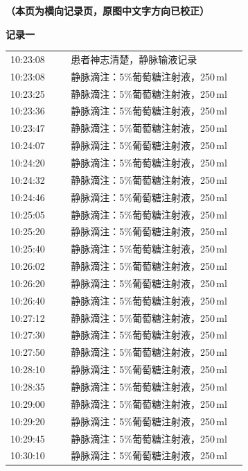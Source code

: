 \documentclass[UTF8,10pt,a4paper,fontset=fandol]{ctexart}
\begin{document}
\newpage

\begin{center}
\textbf{（本页为横向记录页，原图中文字方向已校正）}
\end{center}

\noindent
\begin{minipage}[t]{0.47\linewidth}
\small
\textbf{记录一}\\[2pt]
\begin{tabular}{@{}p{0.24\linewidth}p{0.70\linewidth}@{}}
10:23:08 & 患者神志清楚，静脉输液记录\\
10:23:08 & 静脉滴注：5\%葡萄糖注射液，250\,ml\\
10:23:25 & 静脉滴注：5\%葡萄糖注射液，250\,ml\\
10:23:36 & 静脉滴注：5\%葡萄糖注射液，250\,ml\\
10:23:47 & 静脉滴注：5\%葡萄糖注射液，250\,ml\\
10:24:07 & 静脉滴注：5\%葡萄糖注射液，250\,ml\\
10:24:20 & 静脉滴注：5\%葡萄糖注射液，250\,ml\\
10:24:32 & 静脉滴注：5\%葡萄糖注射液，250\,ml\\
10:24:46 & 静脉滴注：5\%葡萄糖注射液，250\,ml\\
10:25:05 & 静脉滴注：5\%葡萄糖注射液，250\,ml\\
10:25:20 & 静脉滴注：5\%葡萄糖注射液，250\,ml\\
10:25:40 & 静脉滴注：5\%葡萄糖注射液，250\,ml\\
10:26:02 & 静脉滴注：5\%葡萄糖注射液，250\,ml\\
10:26:20 & 静脉滴注：5\%葡萄糖注射液，250\,ml\\
10:26:40 & 静脉滴注：5\%葡萄糖注射液，250\,ml\\
10:27:12 & 静脉滴注：5\%葡萄糖注射液，250\,ml\\
10:27:30 & 静脉滴注：5\%葡萄糖注射液，250\,ml\\
10:27:50 & 静脉滴注：5\%葡萄糖注射液，250\,ml\\
10:28:10 & 静脉滴注：5\%葡萄糖注射液，250\,ml\\
10:28:35 & 静脉滴注：5\%葡萄糖注射液，250\,ml\\
10:29:00 & 静脉滴注：5\%葡萄糖注射液，250\,ml\\
10:29:20 & 静脉滴注：5\%葡萄糖注射液，250\,ml\\
10:29:45 & 静脉滴注：5\%葡萄糖注射液，250\,ml\\
10:30:10 & 静脉滴注：5\%葡萄糖注射液，250\,ml\\

\end{tabular}
\end{minipage}
\end{document}
